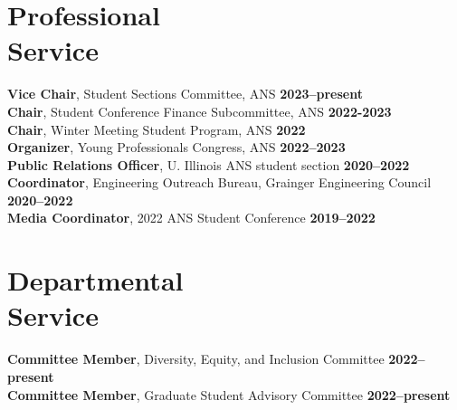 \documentclass[margin,line]{resume}
\begin{document}
\begin{resume}
    \section{\mysidestyle Professional\\Service}
    \textbf{Vice Chair}, Student Sections Committee, ANS \hfill \textbf{2023--present}\vspace{.5mm}\\%
    \textbf{Chair}, Student Conference Finance Subcommittee, ANS \hfill \textbf{2022-2023}\vspace{.5mm}\\%
                \textbf{Chair}, Winter Meeting Student Program, ANS \hfill \textbf{2022}\vspace{.5mm}\\%
    \textbf{Organizer}, Young Professionals Congress, ANS \hfill \textbf{2022--2023}\vspace{.5mm}\\%
                \textbf{Public Relations Officer}, U. Illinois ANS student section  \hfill \textbf{2020--2022}\vspace{.5mm}\\%
    \textbf{Coordinator}, Engineering Outreach Bureau, Grainger Engineering Council \hfill \textbf{2020--2022}\vspace{.5mm}\\%
                \textbf{Media Coordinator}, 2022 ANS Student Conference \hfill \textbf{2019--2022}\vspace{.5mm}\\%
    \section{\mysidestyle Departmental\\Service}
                \textbf{Committee Member}, Diversity, Equity, and Inclusion Committee \hfill \textbf{2022--present}\vspace{.5mm}\\%
                \textbf{Committee Member}, Graduate Student Advisory Committee \hfill \textbf{2022--present}\vspace{.5mm}\\%


\end{resume}
\end{document}
